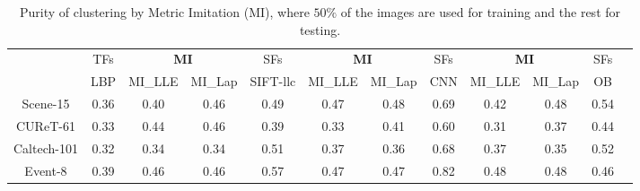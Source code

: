 \documentclass[10pt,twocolumn,letterpaper]{article}
\begin{document}





\begin{table}[!tb]
  \centering \small \setlength{\tabcolsep}{.60em} 
  \caption{Purity of clustering by Metric Imitation (MI), where $50\%$ of the images are used for training and the rest for testing.}
  \begin{tabular}{c|c|ccc|ccc|cccc}
   & TFs & \multicolumn{2}{c}{\textbf{MI}} & SFs & \multicolumn{2}{c}{ \textbf{MI} } & SFs & \multicolumn{2}{c}{ \textbf{MI}} & SFs  \\   
    & LBP & MI\_LLE & MI\_Lap & SIFT-llc  & MI\_LLE & MI\_Lap & CNN &  MI\_LLE & MI\_Lap & OB     \\   \hline
    Scene-15 & 0.36  & 0.40  & 0.46  & 0.49    & 0.47  & 0.48  & 0.69    & 0.42  & 0.48  & 0.54 \\ 
    CUReT-61 & 0.33  & 0.44  & 0.46  & 0.39    & 0.33  & 0.41  & 0.60  & 0.31  & 0.37  & 0.44 \\ 
    Caltech-101 & 0.32  & 0.34  & 0.34  & 0.51   & 0.37  & 0.36  & 0.68       & 0.37  & 0.35 & 0.52    \\
    Event-8 & 0.39  & 0.46  & 0.46  & 0.57    & 0.47  & 0.47  & 0.82    & 0.48  & 0.48  & 0.46 \\  
  \end{tabular}
  \label{tab:clustering}
\end{table}
\end{document}
